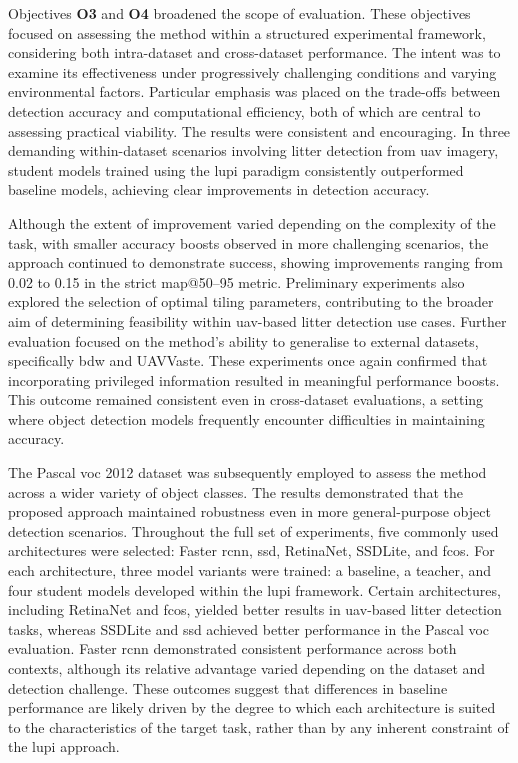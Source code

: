 Objectives \textbf{O3} and \textbf{O4} broadened the scope of evaluation. These objectives focused on assessing the method within a structured experimental framework, considering both intra-dataset and cross-dataset performance. The intent was to examine its effectiveness under progressively challenging conditions and varying environmental factors. Particular emphasis was placed on the trade-offs between detection accuracy and computational efficiency, both of which are central to assessing practical viability. The results were consistent and encouraging. In three demanding within-dataset scenarios involving litter detection from \gls{uav} imagery, student models trained using the \gls{lupi} paradigm consistently outperformed baseline models, achieving clear improvements in detection accuracy.

Although the extent of improvement varied depending on the complexity of the task, with smaller accuracy boosts observed in more challenging scenarios, the approach continued to demonstrate success, showing improvements ranging from 0.02 to 0.15 in the strict \gls{map}@50--95 metric. Preliminary experiments also explored the selection of optimal tiling parameters, contributing to the broader aim of determining feasibility within \gls{uav}-based litter detection use cases. Further evaluation focused on the method’s ability to generalise to external datasets, specifically \gls{bdw} and UAVVaste. These experiments once again confirmed that incorporating privileged information resulted in meaningful performance boosts. This outcome remained consistent even in cross-dataset evaluations, a setting where object detection models frequently encounter difficulties in maintaining accuracy.

The Pascal \gls{voc} 2012 dataset was subsequently employed to assess the method across a wider variety of object classes. The results demonstrated that the proposed approach maintained robustness even in more general-purpose object detection scenarios. Throughout the full set of experiments, five commonly used architectures were selected: Faster \gls{rcnn}, \gls{ssd}, RetinaNet, SSDLite, and \gls{fcos}. For each architecture, three model variants were trained: a baseline, a teacher, and four student models developed within the \gls{lupi} framework. Certain architectures, including RetinaNet and \gls{fcos}, yielded better results in \gls{uav}-based litter detection tasks, whereas SSDLite and \gls{ssd} achieved better performance in the Pascal \gls{voc} evaluation. Faster \gls{rcnn} demonstrated consistent performance across both contexts, although its relative advantage varied depending on the dataset and detection challenge. These outcomes suggest that differences in baseline performance are likely driven by the degree to which each architecture is suited to the characteristics of the target task, rather than by any inherent constraint of the \gls{lupi} approach.

